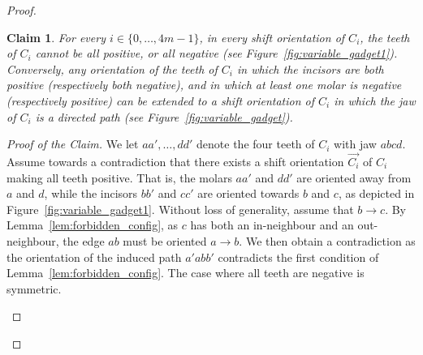 \documentclass[11pt,a4aper]{article}
\newtheorem{claim}[theorem]{Claim}
\newenvironment{poc}{\begin{proof}[Proof of the
    Claim]\renewcommand*{\qedsymbol}{$\blacksquare$}}{\end{proof}}
\DeclareRobustCommand*{\ora}{\overrightarrow}
\newcommand*{\orCi}{\ora{C_i}}
\begin{document}
\begin{proof}
  
  \begin{claim}\label{cl:clause_orientation}
    For every $i\in \{0,\ldots,4m-1\}$, in every shift orientation of $C_i$, the
    teeth of $C_i$ cannot be all positive, or all negative (see Figure~\ref{fig:variable_gadget1}).  Conversely, any
    orientation of the teeth of $C_i$ in which the incisors are both positive
    (respectively both negative), and in which at least one molar is negative (respectively
    positive) can be extended to a shift orientation of $C_i$ in which the jaw
    of $C_i$ is a directed path (see Figure~\ref{fig:variable_gadget}).
  \end{claim}
  \begin{poc}
    We let $aa', \dots, dd'$ denote the four teeth of $C_i$ with jaw
    $abcd$. Assume towards a contradiction that there exists a shift
    orientation $\orCi$ of $C_i$ making all teeth positive. That is, the molars
    $aa'$ and $dd'$ are oriented away from $a$ and $d$, while the incisors
    $bb'$ and $cc'$ are oriented towards $b$ and $c$, as depicted in Figure~\ref{fig:variable_gadget1}. Without loss of
    generality, assume that $b \to c$. By Lemma~\ref{lem:forbidden_config}, as $c$
    has both an in-neighbour and an out-neighbour, the edge $ab$ must be
    oriented $a \to b$. We then obtain a
    contradiction as the orientation of the induced path $a'abb'$ contradicts
    the first condition of Lemma~\ref{lem:forbidden_config}.  The case where all teeth are negative is symmetric.
        \begin{figure}[h!]
      \centering
\end{figure}
\end{poc}
\end{proof}
\end{document}
